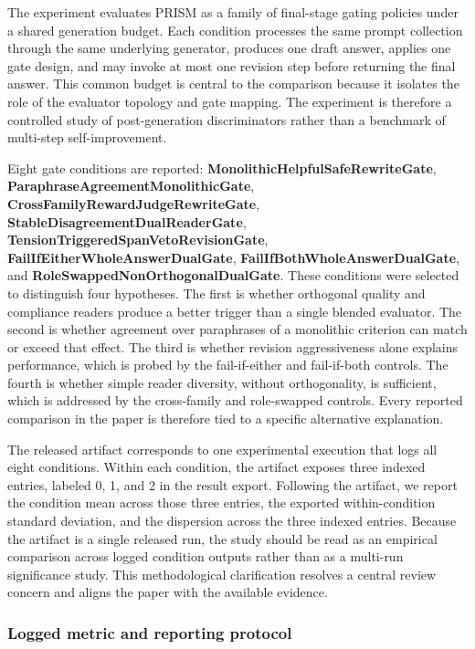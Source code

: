 \documentclass{article}
\begin{document}
\label{sec:experimental_design}

The experiment evaluates PRISM as a family of final-stage gating policies under a shared generation budget. Each condition processes the same prompt collection through the same underlying generator, produces one draft answer, applies one gate design, and may invoke at most one revision step before returning the final answer. This common budget is central to the comparison because it isolates the role of the evaluator topology and gate mapping. The experiment is therefore a controlled study of post-generation discriminators rather than a benchmark of multi-step self-improvement.

Eight gate conditions are reported: \textbf{MonolithicHelpfulSafeRewriteGate}, \textbf{ParaphraseAgreementMonolithicGate}, \textbf{CrossFamilyRewardJudgeRewriteGate}, \textbf{StableDisagreementDualReaderGate}, \textbf{TensionTriggeredSpanVetoRevisionGate}, \textbf{FailIfEitherWholeAnswerDualGate}, \textbf{FailIfBothWholeAnswerDualGate}, and \textbf{RoleSwappedNonOrthogonalDualGate}. These conditions were selected to distinguish four hypotheses. The first is whether orthogonal quality and compliance readers produce a better trigger than a single blended evaluator. The second is whether agreement over paraphrases of a monolithic criterion can match or exceed that effect. The third is whether revision aggressiveness alone explains performance, which is probed by the fail-if-either and fail-if-both controls. The fourth is whether simple reader diversity, without orthogonality, is sufficient, which is addressed by the cross-family and role-swapped controls. Every reported comparison in the paper is therefore tied to a specific alternative explanation.

The released artifact corresponds to one experimental execution that logs all eight conditions. Within each condition, the artifact exposes three indexed entries, labeled 0, 1, and 2 in the result export. Following the artifact, we report the condition mean across those three entries, the exported within-condition standard deviation, and the dispersion across the three indexed entries. Because the artifact is a single released run, the study should be read as an empirical comparison across logged condition outputs rather than as a multi-run significance study. This methodological clarification resolves a central review concern and aligns the paper with the available evidence.

\subsubsection{Logged metric and reporting protocol}
\end{document}
